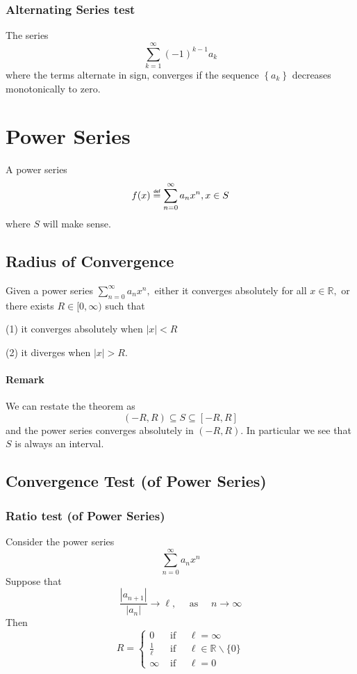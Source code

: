 \documentclass[11pt]{article}
\newcommand\df{\mathrel{\overset{\makebox[0pt]{\mbox{\normalfont\tiny\sffamily def}}}{=}}}
\begin{document}
\subsubsection{Alternating Series test}
The series
$$
\sum_{k=1}^{\infty}(-1)^{k-1} a_{k}
$$
where the terms alternate in sign, converges if the sequence $\left\{a_{k}\right\}$ decreases monotonically to zero.

\newpage
\section{Power Series}
A power series 
$$
f(x) \df \sum _{n=0}^\infty a_n x^n, x\in S
$$
where $S$ will make sense.

\subsection{Radius of Convergence}
Given a power series $\sum_{n=0}^{\infty} a_{n} x^{n},$ either it converges absolutely for all $x \in \mathbb{R},$ or there exists $R \in[0, \infty)$ such that

(1) it converges absolutely when $|x|<R$

(2) it diverges when $|x|>R$.

\paragraph{Remark}
We can restate the theorem as
$$
(-R, R) \subseteq S \subseteq[-R, R]
$$
and the power series converges absolutely in $(-R, R) .$ In particular we see that $S$ is always an interval.

\subsection{Convergence Test (of Power Series)}
\subsubsection{Ratio test (of Power Series)}
Consider the power series
$$
\sum_{n=0}^{\infty} a_{n} x^{n}
$$
Suppose that
$$
\frac{\left|a_{n+1}\right|}{\left|a_{n}\right|} \rightarrow \ell, \quad \text { as } \quad n \rightarrow \infty
$$
Then
$$
R=\left\{\begin{array}{ll}
0 & \text { if } \quad \ell=\infty \\
\frac{1}{\ell} & \text { if } \quad \ell \in \mathbb{R} \backslash\{0\} \\
\infty & \text { if } \quad \ell=0
\end{array}\right.
$$
\end{document}
